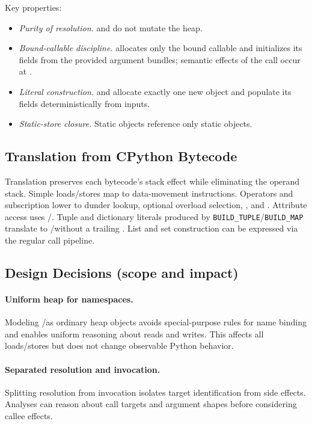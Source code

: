 Key properties:
\begin{itemize}
\item \emph{Purity of resolution.} \tLookupDunder and \tResolveOverload do not mutate the heap.
\item \emph{Bound-callable discipline.} \tBind allocates only the bound callable and initializes its fields from the provided argument bundles; semantic effects of the call occur at \tCall.
\item \emph{Literal construction.} \tConstructTuple and \tConstructDict allocate exactly one new object and populate its fields deterministically from inputs.
\item \emph{Static-store closure.} Static objects reference only static objects.
\end{itemize}

\subsection{Translation from CPython Bytecode}

Translation preserves each bytecode’s stack effect while eliminating the operand stack. Simple loads/stores map to data-movement instructions. Operators and subscription lower to dunder lookup, optional overload selection, \tBind, and \tCall. Attribute access uses \tGetAttr/\tSetAttr. Tuple and dictionary literals produced by \texttt{BUILD\_TUPLE}/\texttt{BUILD\_MAP} translate to \tConstructTuple/\tConstructDict without a trailing \tCall. List and set construction can be expressed via the regular call pipeline.

\subsection{Design Decisions (scope and impact)}

\paragraph{Uniform heap for namespaces.}
Modeling \tLOCALS/\tGLOBALS as ordinary heap objects avoids special-purpose rules for name binding and enables uniform reasoning about reads and writes. This affects all loads/stores but does not change observable Python behavior.

\paragraph{Separated resolution and invocation.}
Splitting resolution from invocation isolates target identification from side effects. Analyses can reason about call targets and argument shapes before considering callee effects.

